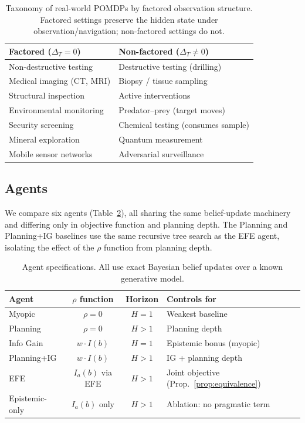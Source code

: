 \documentclass[runningheads]{llncs}
\begin{document}
\begin{table}[ht]
\centering
\caption{Taxonomy of real-world POMDPs by factored observation structure. Factored settings preserve the hidden state under observation/navigation; non-factored settings do not.}
\label{tab:taxonomy}
\begin{small}
\begin{tabular}{p{3.6cm}p{4.2cm}}
\toprule
\textbf{Factored} ($\Delta_T{=}0$) & \textbf{Non-factored} ($\Delta_T{\neq}0$) \\
\midrule
Non-destructive testing & Destructive testing (drilling) \\
Medical imaging (CT, MRI) & Biopsy / tissue sampling \\
Structural inspection & Active interventions \\
Environmental monitoring & Predator--prey (target moves) \\
Security screening & Chemical testing (consumes sample) \\
Mineral exploration & Quantum measurement \\
Mobile sensor networks & Adversarial surveillance \\
\bottomrule
\end{tabular}
\end{small}
\end{table}

\subsection{Agents}

We compare six agents (Table~\ref{tab:agents}), all sharing the same belief-update machinery and differing only in objective function and planning depth. The Planning and Planning+IG baselines use the same recursive tree search as the EFE agent, isolating the effect of the $\rho$ function from planning depth.

\begin{table}[ht]
\centering
\caption{Agent specifications. All use exact Bayesian belief updates over a known generative model.}
\label{tab:agents}
\begin{small}
\begin{tabular}{lccl}
\toprule
Agent & $\rho$ function & Horizon & Controls for \\
\midrule
Myopic & $\rho = 0$ & $H{=}1$ & Weakest baseline \\
Planning & $\rho = 0$ & $H > 1$ & Planning depth \\
Info Gain & $w \cdot I(b)$ & $H{=}1$ & Epistemic bonus (myopic) \\
Planning+IG & $w \cdot I(b)$ & $H > 1$ & IG + planning depth \\
EFE & $I_a(b)$ via EFE & $H > 1$ & Joint objective (Prop.~\ref{prop:equivalence}) \\
Epistemic-only & $I_a(b)$ only & $H > 1$ & Ablation: no pragmatic term \\
\bottomrule
\end{tabular}
\end{small}
\end{table}
\end{document}
